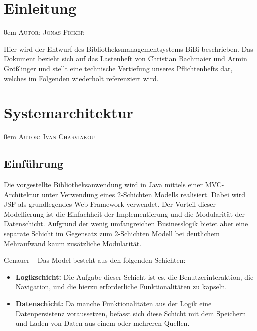 \documentclass{article}
\makeatletter
\newcommand{\sectionauthor}[1]{
	{\parindent 0em \large \scshape Autor: #1 \par \nobreak \vspace*{1em}}
	\@afterheading
}
\makeatother
\begin{document}
\section{Einleitung}
\sectionauthor{Jonas Picker}
Hier wird der Entwurf des Bibliotheksmanagementsystems BiBi beschrieben. Das Dokument bezieht sich auf das Lastenheft von Christian Bachmaier und Armin Größlinger und stellt eine technische Vertiefung unseres Pflichtenhefts dar, welches im Folgenden wiederholt referenziert wird.

\section{Systemarchitektur}
\sectionauthor{Ivan Charviakou}



\subsection{Einführung}

Die vorgestellte Bibliotheksanwendung wird in Java mittels einer MVC-Architektur unter Verwendung eines 2-Schichten Modells realisiert. Dabei wird JSF als grundlegendes Web-Framework verwendet. Der Vorteil dieser Modellierung ist die Einfachheit der Implementierung und die Modularität der Datenschicht. Aufgrund der wenig umfangreichen Businesslogik bietet aber eine separate Schicht im Gegensatz zum 2-Schichten Modell bei deutlichem Mehraufwand kaum zusätzliche Modularität. \vspace{0.5em}

Genauer – Das Model besteht aus den folgenden Schichten:
\begin{itemize}
	\item \textbf{Logikschicht:} Die Aufgabe dieser Schicht ist es, die Benutzerinteraktion, die Navigation, und die hierzu erforderliche Funktionalitäten zu kapseln. 
	\item \textbf{Datenschicht:} Da manche Funktionalitäten aus der Logik eine Datenpersistenz voraussetzen, befasst sich diese Schicht mit dem Speichern und Laden von Daten aus einem oder mehreren Quellen.
\end{itemize}
\end{document}
